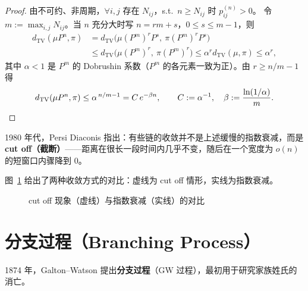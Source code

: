 \documentclass[lang=cn,10pt,newtx,thmcnt=chapter,mode=simple]{vividbook}
\theoremstyle{vividthm}
\theoremstyle{vividdef}
\theoremstyle{vividexa}
\theoremstyle{vividrem}
\begin{document}
\begin{proof}
由不可约、非周期，$\forall i,j$ 存在 $N_{ij}$，s.t.\ $n\ge N_{ij}$ 时 $p_{ij}^{(n)}>0$。
令 $m:=\max_{i,j}N_{ij}$。当 $n$ 充分大时写 $n=rm+s$，$0\le s\le m-1$，则
\begin{align*}
d_{\mathrm{TV}}(\mu P^n,\pi)
&=d_{\mathrm{TV}}\bigl(\mu(P^m)^rP^s,\ \pi(P^m)^rP^s\bigr)\\
&\le d_{\mathrm{TV}}\bigl(\mu(P^m)^r,\ \pi(P^m)^r\bigr)
\le\alpha^r d_{\mathrm{TV}}(\mu,\pi)
\le\alpha^r,
\end{align*}
其中 $\alpha<1$ 是 $P^m$ 的 Dobrushin 系数（$P^m$ 的各元素一致为正）。由 $r\ge n/m-1$ 得
\[
d_{\mathrm{TV}}(\mu P^n,\pi)\le\alpha^{\,n/m-1}=C\,e^{-\beta n},
\qquad C:=\alpha^{-1},\quad \beta:=\frac{\ln(1/\alpha)}{m}. \qedhere
\]
\end{proof}

1980 年代，Persi Diaconis 指出：有些链的收敛并不是上述缓慢的指数衰减，而是
\textbf{cut off（截断）}——距离在很长一段时间内几乎不变，随后在一个宽度为 $o(n)$ 的短窗口内骤降到 $0$。

图~\ref{fig:cutoff} 给出了两种收敛方式的对比：虚线为 cut off 情形，实线为指数衰减。

\begin{figure}[H]
\centering
{}
\caption{cut off 现象（虚线）与指数衰减（实线）的对比}
\label{fig:cutoff}
\end{figure}

\section{分支过程（Branching Process）}

1874 年，Galton--Watson 提出\textbf{分支过程}（GW 过程），最初用于研究家族姓氏的消亡。
\end{document}

